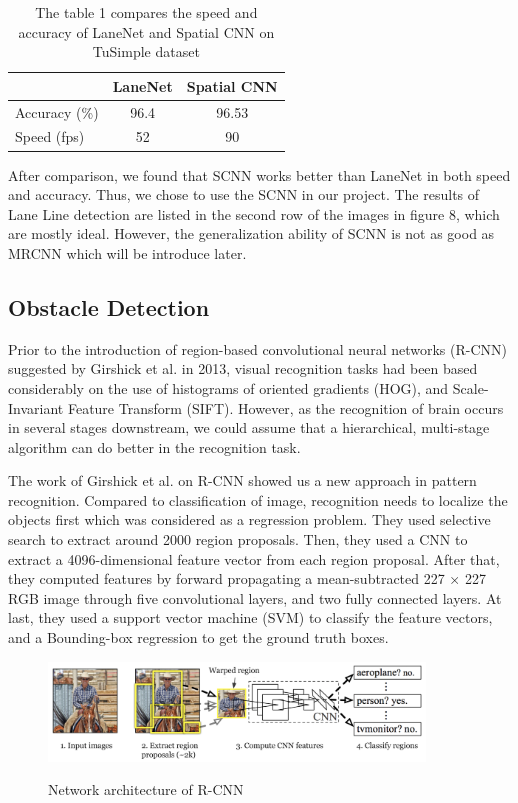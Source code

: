 \documentclass[runningheads]{llncs}
\begin{document}
\begin{table}[!htbp]
	\centering
	\caption{The table 1 compares the speed and accuracy of LaneNet and Spatial CNN on TuSimple dataset}
	\begin{tabular}{|l|c|c|}
		\hline 
		&LaneNet&Spatial CNN\\
		\hline  
		Accuracy (\%)&96.4&96.53\\
		\hline  
		Speed (fps)&52&90\\
		\hline 
	\end{tabular}
\end{table}

After comparison, we found that SCNN works better than 
LaneNet in both speed and accuracy. Thus, we chose to use 
the SCNN in our project. The results of Lane Line detection 
are listed in the second row of the images in figure 8, 
which are mostly ideal. However, the generalization ability 
of SCNN is not as good as MRCNN which will be introduce 
later. 


\subsection{Obstacle Detection}
Prior to the introduction of region-based convolutional 
neural networks (R-CNN) suggested by Girshick et al. 
\cite{RCNN} in 2013, visual recognition tasks had been 
based considerably on the use of histograms of oriented 
gradients (HOG)\cite{HOG}, and Scale-Invariant Feature 
Transform (SIFT)\cite{SIFT}. However, as the recognition of 
brain occurs in several stages downstream, we could assume 
that a hierarchical, multi-stage algorithm can do better in 
the recognition task. 

The work of Girshick et al. on R-CNN showed us a new 
approach in pattern recognition. Compared to classification 
of image, recognition needs to localize the objects first 
which was considered as a regression problem. They used 
selective search to extract around 2000 region proposals. 
Then, they used a CNN to extract a 4096-dimensional feature 
vector from each region proposal. After that, they computed 
features by forward propagating a mean-subtracted 227 × 227 
RGB image through five convolutional layers, and two fully 
connected layers. At last, they used a support vector 
machine (SVM) to classify the feature vectors, and a 
Bounding-box regression to get the ground truth boxes. 

\begin{figure}
    \centering
    \includegraphics[width=10cm]{reference/rcnn}
    \label{fig:RCNN}
    \caption{Network architecture of R-CNN\cite{RCNN}}
\end{figure}
\end{document}
